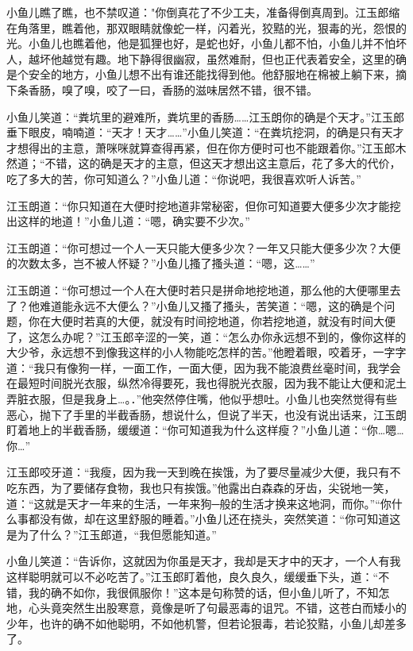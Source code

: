 \documentclass[12pt,oneside]{book}
\begin{document}
小鱼儿瞧了瞧，也不禁叹道："你倒真花了不少工夫，准备得倒真周到。江玉郎缩在角落里，瞧着他，那双眼睛就像蛇一样，闪着光，狡黠的光，狠毒的光，怨恨的光。小鱼儿也瞧着他，他是狐狸也好，是蛇也好，小鱼儿都不怕，小鱼儿并不怕坏人，越坏他越觉有趣。地下静得很幽寂，虽然难耐，但也正代表着安全，这里的确是个安全的地方，小鱼儿想不出有谁还能找得到他。他舒服地在棉被上躺下来，摘下条香肠，嗅了嗅，咬了一曰，香肠的滋味居然不错，很不错。

小鱼儿笑道：``粪坑里的避难所，粪坑里的香肠\ldots\ldots 江玉朗你的确是个天才。''江玉郎垂下眼皮，喃喃道：``天才！天才\ldots\ldots{}''小鱼儿笑道：``在粪坑挖洞，的确是只有天才才想得出的主意，萧咪咪就算查得再紧，但在你方便时可也不能跟着你。''江玉郎木然道；``不错，这的确是天才的主意，但这天才想出这主意后，花了多大的代价，吃了多大的苦，你可知道么？''小鱼儿道：``你说吧，我很喜欢听人诉苦。''

江玉朗道：``你只知道在大便时挖地道非常秘密，但你可知道要大便多少次才能挖出这样的地道！''小鱼儿道：``嗯，确实要不少次。''

江玉朗道：``你可想过一个人一天只能大便多少次？一年又只能大便多少次？大便的次数太多，岂不被人怀疑？''小鱼儿搔了搔头道：``嗯，这\ldots\ldots{}''

江玉朗道：``你可想过一个人在大便时若只是拼命地挖地道，那么他的大便哪里去了？他难道能永远不大便么？''小鱼儿又搔了搔头，苦笑道：``嗯，这的确是个问题，你在大便时若真的大便，就没有时间挖地道，你若挖地道，就没有时间大便了，这怎么办呢？''江玉郎辛涩的一笑，道：``怎么办你永远想不到的，像你这样的大少爷，永远想不到像我这样的小人物能吃怎样的苦。''他瞪着眼，咬着牙，一字字道：``我只有像狗一样，一面工作，一面大便，因为我不能浪费丝毫时间，我学会在最短时间脱光衣服，纵然冷得要死，我也得脱光衣服，因为我不能让大便和泥土弄脏衣服，但是我身上\ldots。．''他突然停住嘴，他似乎想吐。小鱼儿也突然觉得有些恶心，抛下了手里的半截香肠，想说什么，但说了半天，也没有说出话来，江玉朗盯着地上的半截香肠，缓缓道：``你可知道我为什么这样瘦？''小鱼儿道：``你\ldots 嗯\ldots 你\ldots{}''

江玉郎咬牙道：``我瘦，因为我一天到晚在挨饿，为了要尽量减少大便，我只有不吃东西，为了要储存食物，我也只有挨饿。''他露出白森森的牙齿，尖锐地一笑，道：``这就是天才一年来的生活，一年来狗─般的生活才换来这地洞，而你。''``你什么事都没有做，却在这里舒服的睡着。''小鱼儿还在挠头，突然笑道：``你可知道这是为了什么？''江玉郎道，``我但愿能知道。''

小鱼儿笑道：``告诉你，这就因为你虽是天才，我却是天才中的天才，一个人有我这样聪明就可以不必吃苦了。''江玉郎盯着他，良久良久，缓缓垂下头，道：``不错，我的确不如你，我很佩服你！''这本是句称赞的话，但小鱼儿听了，不知怎地，心头竟突然生出股寒意，竟像是听了句最恶毒的诅咒。不错，这苍白而矮小的少年，也许的确不如他聪明，不如他机警，但若论狠毒，若论狡黠，小鱼儿却差多了。
\end{document}
